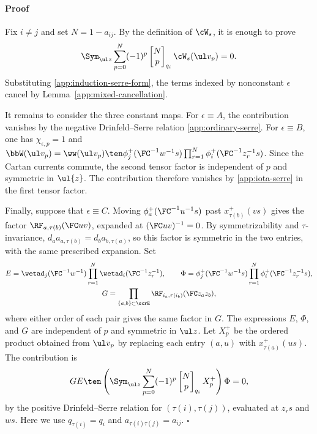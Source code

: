 \documentclass[reqno]{amsart}
\numberwithin{equation}{section}
\newenvironment{pf}{\medskip\paragraph{{\sc Proof}}}{\hfill$\square$\par\medskip}
\begin{document}
\begin{pf}
	Fix $i\ne j$ and set $N=1-a_{ij}$. By the definition of $\cW_s$, it is enough to prove
	\begin{equation}
		\Sym_{\ul z}\sum_{p=0}^{N}(-1)^p
		\begin{bmatrix}N\\p\end{bmatrix}_{q_i}
		\cW_s(\ul v_p)=0.
		\label{app:target-serre}
	\end{equation}
	Substituting \eqref{app:induction-serre-form}, the terms indexed by nonconstant 
	$\epsilon$ cancel by Lemma~\ref{app:mixed-cancellation}.
	
	It remains to consider the three constant maps. For $\epsilon\equiv A$, the contribution 
	vanishes by the negative Drinfeld--Serre relation \eqref{app:ordinary-serre}. For 
	$\epsilon\equiv B$, one has $\chi_{\epsilon,p}=1$ and $\bbW(\ul v_p)=
	\ww(\ul v_p)\ten \phi_j^+({\FC^{-1}w^{-1}} s)\prod_{r=1}^N \phi_i^+({\FC^{-1}z_r^{-1}} s)$. Since the 
	Cartan currents commute, the second tensor factor is independent of $p$ and 
	symmetric in $\ul{z}$. The contribution therefore vanishes by \eqref{app:iota-serre} in 
	the first tensor factor.

	Finally, suppose that $\epsilon\equiv C$. Moving $\phi_a^+({\FC^{-1}u^{-1}} s)$ past $x_{\tau(b)}^+(vs)$ gives the factor $\RF_{a,\tau(b)}(\FC uv)$, expanded at $(\FC uv)^{-1}=0$. By symmetrizability and $\tau$-invariance, $d_a a_{a,\tau(b)}=d_b a_{b,\tau(a)}$, so this factor is symmetric in the two entries, with the same prescribed expansion. Set
	\[
	\begin{gathered}
		E=\wetad_j({\FC^{-1}w^{-1}})\prod_{r=1}^N\wetad_i({\FC^{-1}z_r^{-1}}),\qquad
		\Phi=\phi_j^+({\FC^{-1}w^{-1}} s)\prod_{r=1}^N \phi_i^+({\FC^{-1}z_r^{-1}} s),\\
		G=\prod_{\{a,b\}\subset\scrE}\RF_{i_a,\tau(i_b)}(\FC z_a z_b),
	\end{gathered}
	\]
	where either order of each pair gives the same factor in $G$. The expressions $E$, $\Phi$, and $G$ are independent of $p$ and symmetric in $\ul z$. Let $X_p^+$ be the ordered product obtained from $\ul v_p$ by replacing each entry $(a,u)$ with $x_{\tau(a)}^+(us)$. The contribution is
	\[
	GE\ten\left(\Sym_{\ul z}\sum_{p=0}^N(-1)^p\begin{bmatrix}N\\p\end{bmatrix}_{q_i}X_p^+\right)\Phi=0,
	\]
	by the positive Drinfeld--Serre relation for $(\tau(i),\tau(j))$, evaluated at $z_rs$ and $ws$. Here we use $q_{\tau(i)}=q_i$ and $a_{\tau(i)\tau(j)}=a_{ij}$.
\end{pf}
\end{document}
